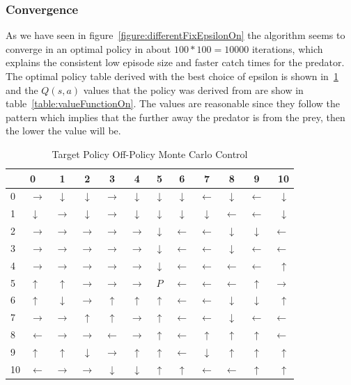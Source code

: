 \documentclass[paper=a4, fontsize=11pt]{scrartcl}
\numberwithin{equation}{section}		%
\numberwithin{figure}{section}			%
\numberwithin{table}{section}				%
\begin{document}
\subsubsection*{Convergence}
As we have seen in figure~\ref{figure:differentFixEpsilonOn} the algorithm seems to converge in an optimal policy in about $100*100 = 10000$ iterations, which explains the consistent low episode size and faster catch times for the predator. The optimal policy table derived with the best choice of epsilon is shown in~\ref{table:onpolicy} and the $Q(s,a)$ values that the policy was derived from are show in table~\ref{table:valueFunctionOn}. The values are reasonable since they follow the pattern which implies that the further away the predator is from the prey, then the lower the value will be.
\begin{table}[H]
\caption{Target Policy Off-Policy Monte Carlo Control}
\centering
\begin{tabular}{l|l*{9}{c}r}
  \hline
 & 0 & 1 & 2 & 3 & 4 & 5 & 6 & 7 & 8 & 9 & 10 \\ \hline 
0&$\rightarrow$& $\downarrow$&	$\downarrow$&	$\rightarrow$&	$\downarrow$&	$\downarrow$&	$\downarrow$&	$\leftarrow$&	$\downarrow$&	$\leftarrow$&	$\downarrow$	\\
1&$\downarrow$&	$\rightarrow$&	$\downarrow$&	$\rightarrow$&	$\downarrow$&	$\downarrow$&	$\downarrow$&	$\downarrow$&	$\leftarrow$&	$\leftarrow$&	$\downarrow$\\	
2&$\rightarrow$&	$\rightarrow$&	$\rightarrow$&	$\rightarrow$&	$\rightarrow$&	$\downarrow$&	$\leftarrow$&	$\leftarrow$&	$\downarrow$&	$\downarrow$&	$\leftarrow$\\
3&$\rightarrow$&	$\rightarrow$&	$\rightarrow$&	$\rightarrow$&	$\rightarrow$&	$\downarrow$&	$\leftarrow$&	$\leftarrow$&	$\downarrow$&	$\leftarrow$&	$\leftarrow$	\\
4&$\rightarrow$&	$\rightarrow$&	$\rightarrow$&	$\rightarrow$&	$\rightarrow$&	$\downarrow$&	$\leftarrow$&	$\leftarrow$&	$\leftarrow$&	$\leftarrow$&	$\uparrow$\\
5&$\uparrow$&	$\uparrow$&	$\rightarrow$&	$\rightarrow$&	$\rightarrow$&	$P$&	$\leftarrow$&	$\leftarrow$&	$\leftarrow$&	$\uparrow$&	$\rightarrow$	\\
6&$\uparrow$&	$\downarrow$&	$\rightarrow$&	$\uparrow$&	$\uparrow$&	$\uparrow$&	$\leftarrow$&	$\leftarrow$&	$\downarrow$&	$\downarrow$&	$\uparrow$\\	
7&$\rightarrow$&	$\rightarrow$&	$\uparrow$&	$\uparrow$&	$\rightarrow$&	$\uparrow$&	$\leftarrow$&	$\leftarrow$&	$\downarrow$&	$\leftarrow$&	$\leftarrow$\\
8&$\leftarrow$&	$\rightarrow$&	$\rightarrow$&	$\leftarrow$&	$\rightarrow$&	$\uparrow$& $\leftarrow$& $\uparrow$&	$\uparrow$&	$\uparrow$&	$\leftarrow$\\
9&$\uparrow$&	$\uparrow$&	$\downarrow$&	$\rightarrow$&	$\uparrow$&	$\uparrow$&	$\leftarrow$&	$\downarrow$&	$\uparrow$&	$\uparrow$&	$\uparrow$\\
10&$\leftarrow$&	$\rightarrow$&	$\rightarrow$&	$\downarrow$&	$\downarrow$&	$\uparrow$&	$\uparrow$&	$\leftarrow$&	$\leftarrow$&	$\uparrow$&	$\uparrow$\\
\end{tabular}
\label{table:onpolicy}
\end{table}
\end{document}
